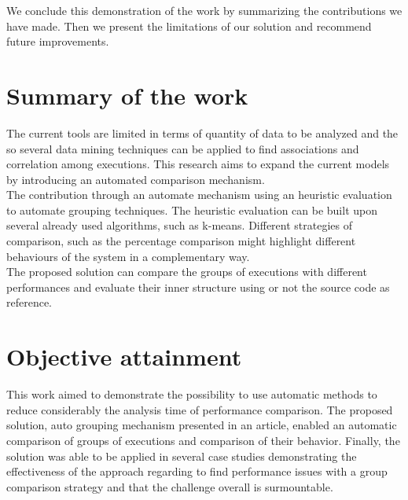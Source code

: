 \label{sec:Conclusion}
We conclude this demonstration of the work by summarizing the contributions we have made. Then we present the limitations of our solution and recommend future improvements.

\section{Summary of the work}
The current tools are limited in terms of quantity of data to be analyzed and the so several data mining techniques can be applied to find associations and correlation among executions. This research aims to expand the current models by introducing an automated comparison mechanism. \\
The contribution through an automate mechanism using an heuristic evaluation to automate grouping techniques. The heuristic evaluation can be built upon several already used algorithms, such as k-means. Different strategies of comparison, such as the percentage comparison might highlight different behaviours of the system in a complementary way.\\
The proposed solution can compare the groups of executions with different performances and evaluate their inner structure using or not the source code as reference.


\section{Objective attainment}\label{sec:Limitations}
This work aimed to demonstrate the possibility to use automatic methods to reduce considerably the analysis time of performance comparison. The proposed solution, auto grouping mechanism presented in an article, enabled an automatic comparison of groups of executions and comparison of their behavior. Finally, the solution was able to be applied in several case studies demonstrating the effectiveness of the approach regarding to find performance issues with a group comparison strategy and that the challenge overall is surmountable.\\
